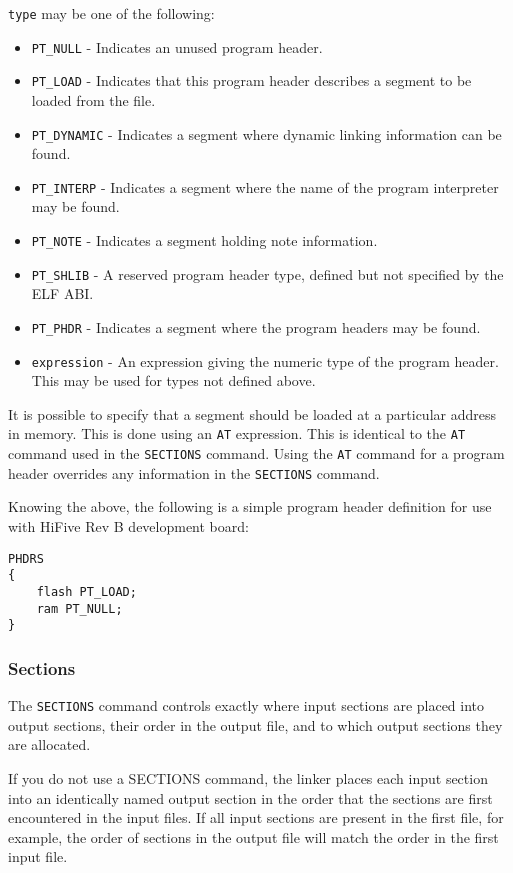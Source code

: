 \lstinline|type| may be one of the following\cite{gnuldProgramHeaders}:
\begin{itemize}
    \item \lstinline|PT_NULL| - Indicates an unused program header.
    \item \lstinline|PT_LOAD| - Indicates that this program header describes a segment to be loaded from the file.
    \item \lstinline|PT_DYNAMIC| - Indicates a segment where dynamic linking information can be found.
    \item \lstinline|PT_INTERP| - Indicates a segment where the name of the program interpreter may be found.
    \item \lstinline|PT_NOTE| - Indicates a segment holding note information.
    \item \lstinline|PT_SHLIB| - A reserved program header type, defined but not specified by the ELF ABI.
    \item \lstinline|PT_PHDR| - Indicates a segment where the program headers may be found.
    \item \lstinline|expression| - An expression giving the numeric type of the program header. This may be used for types not defined above.
\end{itemize}

It is possible to specify that a segment should be loaded at a particular address in memory. This is done using an \lstinline|AT| expression. This is identical to the \lstinline|AT| command used in the \lstinline|SECTIONS| command. Using the \lstinline|AT| command for a program header overrides any information in the \lstinline|SECTIONS| command.\cite{gnuldProgramHeaders}

Knowing the above, the following is a simple program header definition for use with HiFive Rev B development board:
\begin{lstlisting}
PHDRS
{
    flash PT_LOAD;
    ram PT_NULL;
}
\end{lstlisting}

\subsubsection{Sections}
The \lstinline|SECTIONS| command controls exactly where input sections are placed into output sections, their order in the output file, and to which output sections they are allocated.\cite{gnuldOutputSections}

If you do not use a SECTIONS command, the linker places each input section into an identically named output section in the order that the sections are first encountered in the input files. If all input sections are present in the first file, for example, the order of sections in the output file will match the order in the first input file.\cite{gnuldOutputSections}

